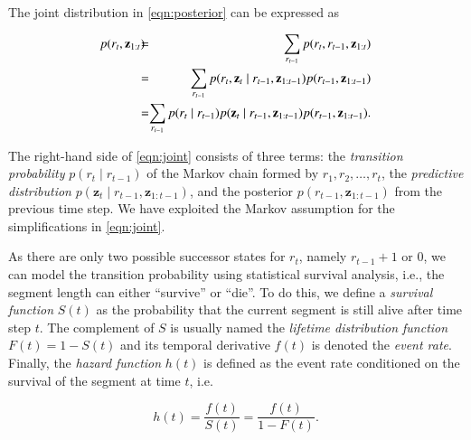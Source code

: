 The joint distribution in \eqref{eqn:posterior} can be expressed as

\begin{eqnarray}
\label{eqn:joint}
p(r_t,\mathbf{z}_{1:t}) \hspace{-0.2cm}&=& \hspace{-0.35cm} \sum_{r_{t-1}}p(r_t,r_{t-1},\mathbf{z}_{1:t})\nonumber\\
               &=& \hspace{-0.35cm} \sum_{r_{t-1}}p(r_t,\mathbf{z}_t\mid r_{t-1},\mathbf{z}_{1:t-1})p(r_{t-1},
                   \mathbf{z}_{1:t-1})\nonumber\\
             &  = &  \hspace{-0.35cm}
             \sum_{r_{t-1}}p(r_t\mid r_{t-1})p(\mathbf{z}_t\mid r_{t-1},\mathbf{z}_{1:t-1})p(r_{t-1},\mathbf{z}_{1:t-1}).
\end{eqnarray}

The right-hand side of \eqref{eqn:joint} consists of three terms: the
\emph{transition probability} $p(r_t\mid r_{t-1})$ of the Markov chain formed by
$r_1,r_2,\dots,r_t$, the \emph{predictive distribution}
$p(\mathbf{z}_t\mid r_{t-1},\mathbf{z}_{1:t-1})$, and the posterior
$p(r_{t-1},\mathbf{z}_{1:t-1})$ from the previous time step. We have exploited
the Markov assumption for the simplifications in \eqref{eqn:joint}.


As there are only two possible successor states for $r_t$, namely
\mbox{$r_{t-1}+1$} or $0$, we can model the transition probability using
statistical survival analysis, i.e., the segment length can
either ``survive'' or ``die''. To do this, we define a \emph{survival function}
$S(t)$ as the probability that the current segment is still alive after time
step $t$. The complement of $S$ is usually named the
\emph{lifetime distribution function} $F(t)= 1- S(t)$ and its temporal
derivative $f(t)$ is denoted the \emph{event rate}. Finally, the
\emph{hazard function} $h(t)$ is defined as the event rate conditioned on the
survival of the segment at time $t$, i.e.

\begin{equation}
\label{eqn:hazardfunc}
h(t) = \frac{f(t)}{S(t)} = \frac{f(t)}{1 - F(t)}.
\end{equation}


